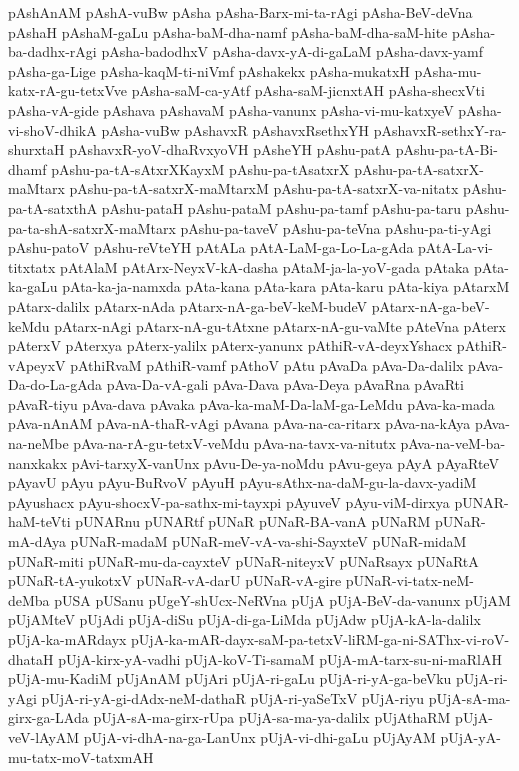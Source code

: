 {pAshAnAM
pAshA-vuBw
pAsha
pAsha-Barx-mi-ta-rAgi
pAsha-BeV-deVna
pAshaH
pAshaM-gaLu
pAsha-baM-dha-namf
pAsha-baM-dha-saM-hite
pAsha-ba-dadhx-rAgi
pAsha-badodhxV
pAsha-davx-yA-di-gaLaM
pAsha-davx-yamf
pAsha-ga-Lige
pAsha-kaqM-ti-niVmf
pAshakekx
pAsha-mukatxH
pAsha-mu-katx-rA-gu-tetxVve
pAsha-saM-ca-yAtf
pAsha-saM-jicnxtAH
pAsha-shecxVti
pAsha-vA-gide
pAshava
pAshavaM
pAsha-vanunx
pAsha-vi-mu-katxyeV
pAsha-vi-shoV-dhikA
pAsha-vuBw
pAshavxR
pAshavxRsethxYH
pAshavxR-sethxY-ra-shurxtaH
pAshavxR-yoV-dhaRvxyoVH
pAsheYH
pAshu-patA
pAshu-pa-tA-Bi-dhamf
pAshu-pa-tA-sAtxrXKayxM
pAshu-pa-tAsatxrX
pAshu-pa-tA-satxrX-maMtarx
pAshu-pa-tA-satxrX-maMtarxM
pAshu-pa-tA-satxrX-va-nitatx
pAshu-pa-tA-satxthA
pAshu-pataH
pAshu-pataM
pAshu-pa-tamf
pAshu-pa-taru
pAshu-pa-ta-shA-satxrX-maMtarx
pAshu-pa-taveV
pAshu-pa-teVna
pAshu-pa-ti-yAgi
pAshu-patoV
pAshu-reVteYH
pAtALa
pAtA-LaM-ga-Lo-La-gAda
pAtA-La-vi-titxtatx
pAtAlaM
pAtArx-NeyxV-kA-dasha
pAtaM-ja-la-yoV-gada
pAtaka
pAta-ka-gaLu
pAta-ka-ja-namxda
pAta-kana
pAta-kara
pAta-karu
pAta-kiya
pAtarxM
pAtarx-dalilx
pAtarx-nAda
pAtarx-nA-ga-beV-keM-budeV
pAtarx-nA-ga-beV-keMdu
pAtarx-nAgi
pAtarx-nA-gu-tAtxne
pAtarx-nA-gu-vaMte
pAteVna
pAterx
pAterxV
pAterxya
pAterx-yalilx
pAterx-yanunx
pAthiR-vA-deyxYshacx
pAthiR-vApeyxV
pAthiRvaM
pAthiR-vamf
pAthoV
pAtu
pAvaDa
pAva-Da-dalilx
pAva-Da-do-La-gAda
pAva-Da-vA-gali
pAva-Dava
pAva-Deya
pAvaRna
pAvaRti
pAvaR-tiyu
pAva-dava
pAvaka
pAva-ka-maM-Da-laM-ga-LeMdu
pAva-ka-mada
pAva-nAnAM
pAva-nA-thaR-vAgi
pAvana
pAva-na-ca-ritarx
pAva-na-kAya
pAva-na-neMbe
pAva-na-rA-gu-tetxV-veMdu
pAva-na-tavx-va-nitutx
pAva-na-veM-ba-nanxkakx
pAvi-tarxyX-vanUnx
pAvu-De-ya-noMdu
pAvu-geya
pAyA
pAyaRteV
pAyavU
pAyu
pAyu-BuRvoV
pAyuH
pAyu-sAthx-na-daM-gu-la-davx-yadiM
pAyushacx
pAyu-shocxV-pa-sathx-mi-tayxpi
pAyuveV
pAyu-viM-dirxya
pUNAR-haM-teVti
pUNARnu
pUNARtf
pUNaR
pUNaR-BA-vanA
pUNaRM
pUNaR-mA-dAya
pUNaR-madaM
pUNaR-meV-vA-va-shi-SayxteV
pUNaR-midaM
pUNaR-miti
pUNaR-mu-da-cayxteV
pUNaR-niteyxV
pUNaRsayx
pUNaRtA
pUNaR-tA-yukotxV
pUNaR-vA-darU
pUNaR-vA-gire
pUNaR-vi-tatx-neM-deMba
pUSA
pUSanu
pUgeY-shUcx-NeRVna
pUjA
pUjA-BeV-da-vanunx
pUjAM
pUjAMteV
pUjAdi
pUjA-diSu
pUjA-di-ga-LiMda
pUjAdw
pUjA-kA-la-dalilx
pUjA-ka-mARdayx
pUjA-ka-mAR-dayx-saM-pa-tetxV-liRM-ga-ni-SAThx-vi-roV-dhataH
pUjA-kirx-yA-vadhi
pUjA-koV-Ti-samaM
pUjA-mA-tarx-su-ni-maRlAH
pUjA-mu-KadiM
pUjAnAM
pUjAri
pUjA-ri-gaLu
pUjA-ri-yA-ga-beVku
pUjA-ri-yAgi
pUjA-ri-yA-gi-dAdx-neM-dathaR
pUjA-ri-yaSeTxV
pUjA-riyu
pUjA-sA-ma-girx-ga-LAda
pUjA-sA-ma-girx-rUpa
pUjA-sa-ma-ya-dalilx
pUjAthaRM
pUjA-veV-lAyAM
pUjA-vi-dhA-na-ga-LanUnx
pUjA-vi-dhi-gaLu
pUjAyAM
pUjA-yA-mu-tatx-moV-tatxmAH
}
